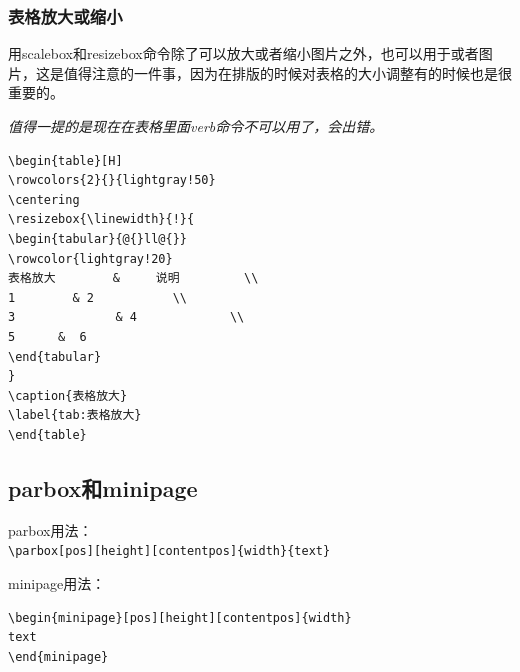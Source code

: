 \documentclass[12pt,oneside]{book}
\begin{document}
\begin{common-format}
\subsubsection{表格放大或缩小}
用scalebox和resizebox命令除了可以放大或者缩小图片之外，也可以用于或者图片，这是值得注意的一件事，因为在排版的时候对表格的大小调整有的时候也是很重要的。

\emph{值得一提的是现在在表格里面verb命令不可以用了，会出错。}

\begin{Verbatim}
\begin{table}[H]
\rowcolors{2}{}{lightgray!50}
\centering
\resizebox{\linewidth}{!}{
\begin{tabular}{@{}ll@{}}
\rowcolor{lightgray!20}
表格放大        &     说明         \\ 
1        & 2           \\
3              & 4             \\
5      &  6        
\end{tabular}
}
\caption{表格放大}
\label{tab:表格放大}
\end{table}
\end{Verbatim}


\begin{table}[H]
\centering
{}
\caption{表格放大}
\label{tab:表格放大}
\end{table}



\subsection{parbox和minipage}
parbox用法：\\
\verb+\parbox[pos][height][contentpos]{width}{text}+

minipage用法：
\begin{Verbatim}
\begin{minipage}[pos][height][contentpos]{width}
text
\end{minipage} 
\end{Verbatim}


\end{common-format}
\end{document}
